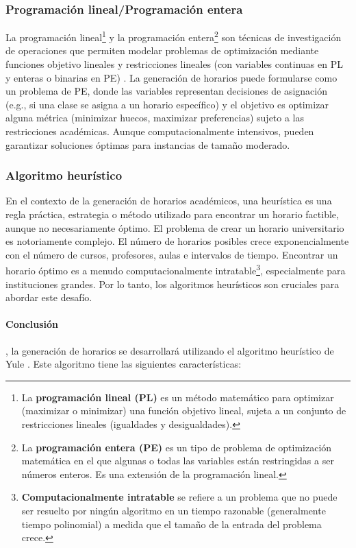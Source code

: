 \subsubsection{Programación lineal/Programación entera}
La programación lineal\footnote{La \textbf{programación lineal (PL)} es un método matemático para optimizar (maximizar o minimizar) una función objetivo lineal, sujeta a un conjunto de restricciones lineales (igualdades y desigualdades).} y la programación entera\footnote{La \textbf{programación entera (PE)} es un tipo de problema de optimización matemática en el que algunas o todas las variables están restringidas a ser números enteros.
Es una extensión de la programación lineal.} son técnicas de investigación de operaciones que permiten modelar problemas de optimización mediante funciones objetivo lineales y restricciones lineales (con variables continuas en PL y enteras o binarias en PE) \parencite{Winston2004}.
La generación de horarios puede formularse como un problema de PE, donde las variables representan decisiones de asignación (e.g., si una clase se asigna a un horario específico) y el objetivo es optimizar alguna métrica (minimizar huecos, maximizar preferencias) sujeto a las restricciones académicas.
Aunque computacionalmente intensivos, pueden garantizar soluciones óptimas para instancias de tamaño moderado.

\subsubsection{Algoritmo heurístico}

En el contexto de la generación de horarios académicos, una heurística es una regla práctica, estrategia o método utilizado para encontrar un horario factible, aunque no necesariamente óptimo.
El problema de crear un horario universitario es notoriamente complejo.
El número de horarios posibles crece exponencialmente con el número de cursos, profesores, aulas e intervalos de tiempo.
Encontrar un horario óptimo es a menudo computacionalmente intratable\footnote{\textbf{Computacionalmente intratable} se refiere a un problema que no puede ser resuelto por ningún algoritmo en un tiempo razonable (generalmente tiempo polinomial) a medida que el tamaño de la entrada del problema crece.}, especialmente para instituciones grandes.
Por lo tanto, los algoritmos heurísticos son cruciales para abordar este desafío.

\paragraph{Conclusión}
, la generación de horarios se desarrollará utilizando el algoritmo heurístico de Yule \cite{Yule1969}.
Este algoritmo tiene las siguientes características:

